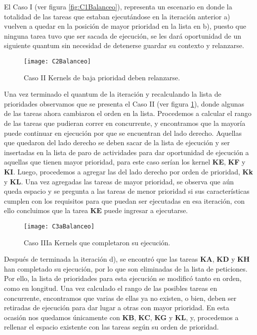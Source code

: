 El Caso I (ver figura \ref{fig:C1Balanceo}), representa un escenario en donde la totalidad de las tareas que estaban ejecutándose en la iteración anterior a) vuelven a quedar en la posición de mayor prioridad en la lista en b), puesto que ninguna tarea tuvo que ser sacada de ejecución, se les dará oportunidad de un siguiente quantum sin necesidad de detenerse guardar su contexto y relanzarse.
    \newline
    
    \begin{figure}[!]
      \centering
        \texttt{[image: C2Balanceo]}
        \caption{Caso II Kernels de baja prioridad deben relanzarse.}
        \label{fig:C2Balanceo}
    \end{figure}
    
    Una vez terminado el quantum de la iteración y recalculando la lista de prioridades observamos que se presenta el Caso II (ver figura \ref{fig:C2Balanceo}), donde algunas de las tareas ahora cambiaron el orden en la lista. Procedemos a calcular el rango de las tareas que pudieran correr en concurrente, y encontramos que la mayoría puede continuar en ejecución por que se encuentran del lado derecho. Aquellas que quedaron del lado derecho se deben sacar de la lista de ejecución y ser insertadas en la lista de paro de actividades para dar oportunidad de ejecución a aquellas que tienen mayor prioridad, para este caso serían los kernel \textbf{KE}, \textbf{KF} y \textbf{KI}. Luego, procedemos a agregar las del lado derecho por orden de prioridad, \textbf{Kk} y \textbf{KL}. 
    Una vez agregadas las tareas de mayor prioridad, se observa que aún queda espacio y se pregunta a las tareas de menor prioridad si sus características cumplen con los requisitos para que puedan ser ejecutadas en esa iteración, con ello concluimos que la tarea \textbf{KE} puede ingresar a ejecutarse.     
    \newline
    
    \begin{figure}[!]
      \centering
        \texttt{[image: C3aBalanceo]}
        \caption{Caso IIIa Kernels que completaron su ejecución.}
        \label{fig:C3aBalanceo}
    \end{figure}

    Después de terminada la iteración d), se encontró que las tareas \textbf{KA}, \textbf{KD} y \textbf{KH} han completado su ejecución, por lo que son eliminadas de la lista de peticiones. Por ello, la lista de prioridades para esta ejecución se modificó tanto en orden, como en longitud. Una vez calculado el rango de las posibles tareas en concurrente, encontramos que varias de ellas ya no existen, o bien, deben ser retiradas de ejecución para dar lugar a otras con mayor prioridad. En esta ocasión nos quedamos únicamente con \textbf{KB}, \textbf{KC}, \textbf{KG} y \textbf{KL}, y, procedemos a rellenar el espacio existente con las tareas según su orden de prioridad. 
    \newline
    
